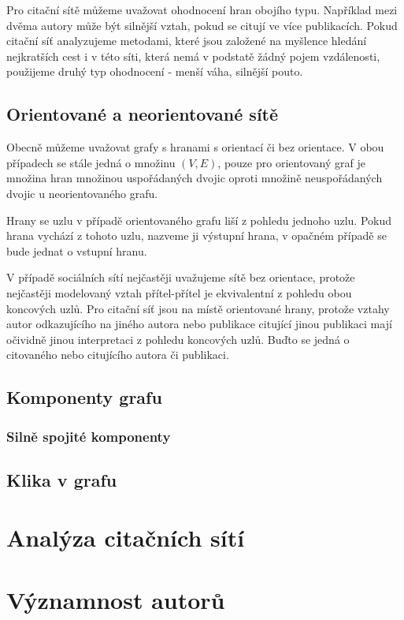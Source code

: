 \documentclass[12pt,titlepage]{report}
\begin{document}
Pro citační sítě můžeme uvažovat ohodnocení hran obojího typu. Například mezi
dvěma autory může být silnější vztah, pokud se citují ve více publikacích.
Pokud citační síť analyzujeme metodami, které jsou založené na myšlence hledání
nejkratších cest i v této síti, která nemá v podstatě žádný pojem vzdálenosti,
použijeme druhý typ ohodnocení - menší váha, silnější pouto.


\subsection{Orientované a neorientované sítě}
Obecně můžeme uvažovat grafy s hranami s orientací či bez orientace. V obou
případech se stále jedná o množinu $(V, E)$, pouze pro orientovaný graf je
množina hran množinou uspořádaných dvojic oproti množině neuspořádaných dvojic
u neorientovaného grafu.

Hrany se uzlu v případě orientovaného grafu liší z pohledu jednoho uzlu. Pokud
hrana vychází z tohoto uzlu, nazveme ji výstupní hrana, v opačném případě se
bude jednat o vstupní hranu.

V případě sociálních sítí nejčastěji uvažujeme sítě bez orientace, protože
nejčastěji modelovaný vztah přítel-přítel je ekvivalentní z pohledu obou
koncových uzlů. Pro citační síť jsou na místě orientované hrany, protože vztahy
autor odkazujícího na jiného autora nebo publikace citující jinou publikaci
mají očividně jinou interpretaci z pohledu koncových uzlů. Buďto se jedná o
citovaného nebo citujícího autora či publikaci.

\subsection{Komponenty grafu}
\subsubsection{Silně spojité komponenty}
\subsection{Klika v grafu}

\section{Analýza citačních sítí}
\section{Významnost autorů}
\end{document}
